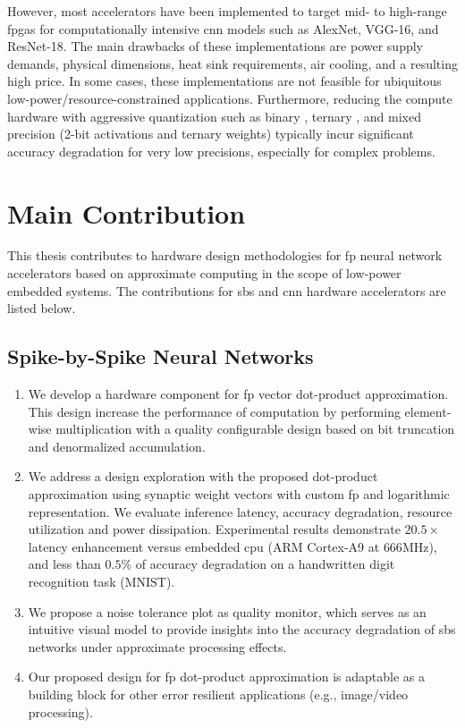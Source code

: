 \begin{itemize}
However, most accelerators have been implemented to target mid- to high-range \glspl{fpga} for computationally intensive \gls{cnn} models such as AlexNet, VGG-16, and ResNet-18. The main drawbacks of these implementations are power supply demands, physical dimensions, heat sink requirements, air cooling, and a resulting high price. In some cases, these implementations are not feasible for ubiquitous low-power/resource-constrained applications. Furthermore, reducing the compute hardware with aggressive quantization such as binary \cite{courbariaux2015binaryconnect}, ternary \cite{lin2015neural}, and mixed precision (2-bit activations and ternary weights) \cite{colangelo2018exploration} typically incur significant accuracy degradation for very low precisions, especially for complex problems\cite{faraone2019addnet}.

\end{itemize}

\section{Main Contribution}
This thesis contributes to hardware design methodologies for \gls{fp} neural network accelerators based on approximate computing in the scope of low-power embedded systems. The contributions for \gls{sbs} and \gls{cnn} hardware accelerators are listed below.

\subsection{Spike-by-Spike Neural Networks}
\begin{enumerate}
	\item We develop a hardware component for \gls{fp} vector dot-product approximation. This design increase the performance of computation by performing element-wise multiplication with a quality configurable design based on bit truncation and denormalized accumulation.
	\item We address a design exploration with the proposed dot-product approximation using synaptic weight vectors with custom \gls{fp} and logarithmic representation. We evaluate inference latency, accuracy degradation, resource utilization and power dissipation. Experimental results demonstrate $20.5\times$ latency enhancement versus embedded \gls{cpu} (ARM Cortex-A9 at $666$MHz), and less than $0.5\%$ of accuracy degradation on a handwritten digit recognition task (MNIST).
	\item We propose a noise tolerance plot as quality monitor, which serves as an intuitive visual model to provide insights into the accuracy degradation of \gls{sbs} networks under approximate processing effects.
	\item Our proposed design for \gls{fp} dot-product approximation is adaptable as a building block for other error resilient applications (e.g., image/video processing).
\end{enumerate}


